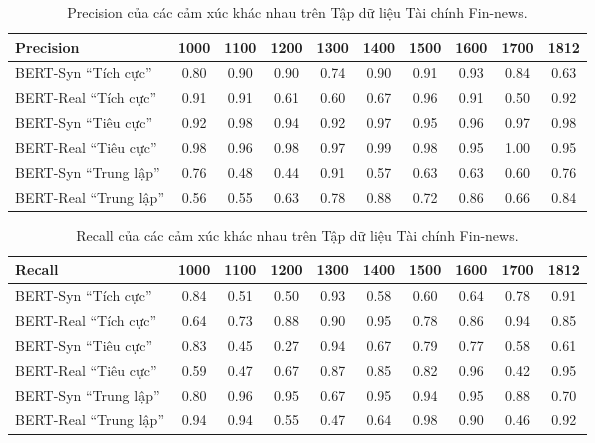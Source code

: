 \documentclass[a4paper,10pt]{article}
\begin{document}
\begin{table}[h]
    \renewcommand{\thetable}{12}
    \centering
    \caption{Precision của các cảm xúc khác nhau trên Tập dữ liệu Tài chính Fin-news.}
    \label{tab:precision_fin_news}
    \begin{tabular}{lccccccccc}
        \hline
        Precision & 1000 & 1100 & 1200 & 1300 & 1400 & 1500 & 1600 & 1700 & 1812 \\
        \hline
        BERT-Syn “Tích cực”  & 0.80 & 0.90 & 0.90 & 0.74 & 0.90 & 0.91 & 0.93 & 0.84 & 0.63 \\
        BERT-Real “Tích cực” & 0.91 & 0.91 & 0.61 & 0.60 & 0.67 & 0.96 & 0.91 & 0.50 & 0.92 \\
        BERT-Syn “Tiêu cực”  & 0.92 & 0.98 & 0.94 & 0.92 & 0.97 & 0.95 & 0.96 & 0.97 & 0.98 \\
        BERT-Real “Tiêu cực” & 0.98 & 0.96 & 0.98 & 0.97 & 0.99 & 0.98 & 0.95 & 1.00 & 0.95 \\
        BERT-Syn “Trung lập” & 0.76 & 0.48 & 0.44 & 0.91 & 0.57 & 0.63 & 0.63 & 0.60 & 0.76 \\
        BERT-Real “Trung lập”& 0.56 & 0.55 & 0.63 & 0.78 & 0.88 & 0.72 & 0.86 & 0.66 & 0.84 \\
        \hline
    \end{tabular}
\end{table}

\begin{table}[h]
    \renewcommand{\thetable}{13}
    \centering
    \caption{Recall của các cảm xúc khác nhau trên Tập dữ liệu Tài chính Fin-news.}
    \label{tab:recall_fin_news}
    \begin{tabular}{lccccccccc}
        \hline
        Recall & 1000 & 1100 & 1200 & 1300 & 1400 & 1500 & 1600 & 1700 & 1812 \\
        \hline
        BERT-Syn “Tích cực”  & 0.84 & 0.51 & 0.50 & 0.93 & 0.58 & 0.60 & 0.64 & 0.78 & 0.91 \\
        BERT-Real “Tích cực” & 0.64 & 0.73 & 0.88 & 0.90 & 0.95 & 0.78 & 0.86 & 0.94 & 0.85 \\
        BERT-Syn “Tiêu cực”  & 0.83 & 0.45 & 0.27 & 0.94 & 0.67 & 0.79 & 0.77 & 0.58 & 0.61 \\
        BERT-Real “Tiêu cực” & 0.59 & 0.47 & 0.67 & 0.87 & 0.85 & 0.82 & 0.96 & 0.42 & 0.95 \\
        BERT-Syn “Trung lập” & 0.80 & 0.96 & 0.95 & 0.67 & 0.95 & 0.94 & 0.95 & 0.88 & 0.70 \\
        BERT-Real “Trung lập”& 0.94 & 0.94 & 0.55 & 0.47 & 0.64 & 0.98 & 0.90 & 0.46 & 0.92 \\
        \hline
    \end{tabular}
\end{table}
\end{document}
